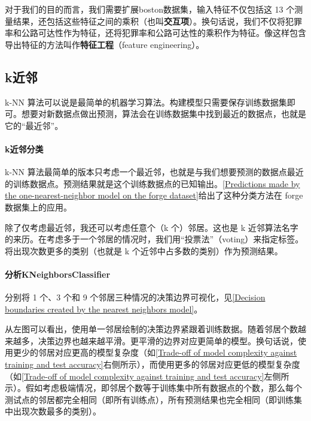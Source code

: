对于我们的目的而言，我们需要扩展boston数据集，输入特征不仅包括这 13 个测量结果，还包括这些特征之间的乘积（也叫\textbf{交互项}）。换句话说，我们不仅将犯罪率和公路可达性作为特征，还将犯罪率和公路可达性的乘积作为特征。像这样包含导出特征的方法叫作\textbf{特征工程}（feature engineering）。

\subsection{k近邻}
k-NN 算法可以说是最简单的机器学习算法。构建模型只需要保存训练数据集即可。想要对新数据点做出预测，算法会在训练数据集中找到最近的数据点，也就是它的“最近邻”。

\paragraph{k近邻分类} k-NN 算法最简单的版本只考虑一个最近邻，也就是与我们想要预测的数据点最近的训练数据点。预测结果就是这个训练数据点的已知输出。\autoref{Predictions made by the one-nearest-neighbor model on the forge dataset}给出了这种分类方法在 forge 数据集上的应用。


除了仅考虑最近邻，我还可以考虑任意个（k 个）邻居。这也是 k 近邻算法名字的来历。在考虑多于一个邻居的情况时，我们用“投票法”（voting）来指定标签。将出现次数更多的类别（也就是 k 个近邻中占多数的类别）作为预测结果。


\paragraph{分析KNeighborsClassifier} 分别将 1 个、3 个和 9 个邻居三种情况的决策边界可视化，见\autoref{Decision boundaries created by the nearest neighbors model}。


从左图可以看出，使用单一邻居绘制的决策边界紧跟着训练数据。随着邻居个数越来越多，决策边界也越来越平滑。更平滑的边界对应更简单的模型。换句话说，使用更少的邻居对应更高的模型复杂度（如\autoref{Trade-off of model complexity against training and test accuracy}右侧所示），而使用更多的邻居对应更低的模型复杂度（如\autoref{Trade-off of model complexity against training and test accuracy}左侧所示）。假如考虑极端情况，即邻居个数等于训练集中所有数据点的个数，那么每个测试点的邻居都完全相同（即所有训练点），所有预测结果也完全相同（即训练集中出现次数最多的类别）。

